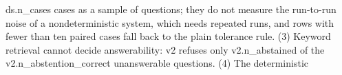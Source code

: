 {{ds.n_cases}} cases as a sample of questions; they do not measure the run-to-run
noise of a nondeterministic system, which needs repeated runs, and rows
with fewer than ten paired cases fall back to the plain tolerance rule.
(3) Keyword retrieval cannot decide answerability: v2 refuses only {{v2.n_abstained}} of the
{{v2.n_abstention_correct}} unanswerable questions. (4) The deterministic
